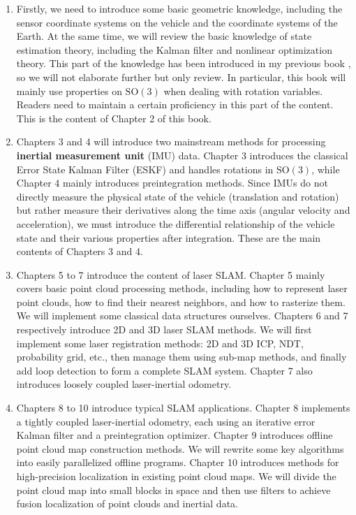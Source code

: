 \begin{enumerate}
	\item Firstly, we need to introduce some basic geometric knowledge, including the sensor coordinate systems on the vehicle and the coordinate systems of the Earth. At the same time, we will review the basic knowledge of state estimation theory, including the Kalman filter and nonlinear optimization theory. This part of the knowledge has been introduced in my previous book \cite{Gao2017}, so we will not elaborate further but only review. In particular, this book will mainly use properties on $\mathrm{SO}(3)$ when dealing with rotation variables. Readers need to maintain a certain proficiency in this part of the content. This is the content of Chapter 2 of this book.
	\item Chapters 3 and 4 will introduce two mainstream methods for processing \textbf{inertial measurement unit} (IMU) data. Chapter 3 introduces the classical Error State Kalman Filter (ESKF) and handles rotations in $\mathrm{SO}(3)$, while Chapter 4 mainly introduces preintegration methods. Since IMUs do not directly measure the physical state of the vehicle (translation and rotation) but rather measure their derivatives along the time axis (angular velocity and acceleration), we must introduce the differential relationship of the vehicle state and their various properties after integration. These are the main contents of Chapters 3 and 4.
	\item Chapters 5 to 7 introduce the content of laser SLAM. Chapter 5 mainly covers basic point cloud processing methods, including how to represent laser point clouds, how to find their nearest neighbors, and how to rasterize them. We will implement some classical data structures ourselves. Chapters 6 and 7 respectively introduce 2D and 3D laser SLAM methods. We will first implement some laser registration methods: 2D and 3D ICP, NDT, probability grid, etc., then manage them using sub-map methods, and finally add loop detection to form a complete SLAM system. Chapter 7 also introduces loosely coupled laser-inertial odometry.
	\item Chapters 8 to 10 introduce typical SLAM applications. Chapter 8 implements a tightly coupled laser-inertial odometry, each using an iterative error Kalman filter and a preintegration optimizer. Chapter 9 introduces offline point cloud map construction methods. We will rewrite some key algorithms into easily parallelized offline programs. Chapter 10 introduces methods for high-precision localization in existing point cloud maps. We will divide the point cloud map into small blocks in space and then use filters to achieve fusion localization of point clouds and inertial data.
\end{enumerate}

